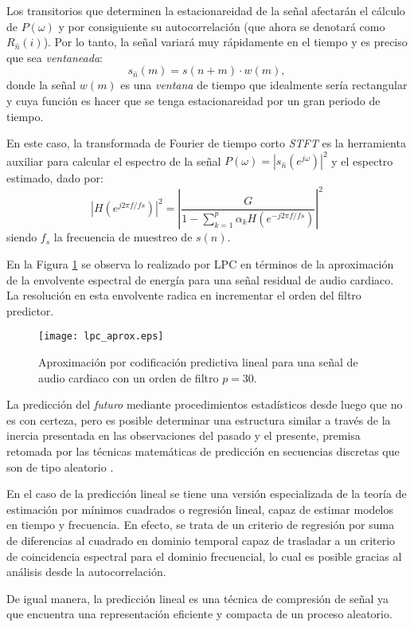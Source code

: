 Los transitorios que determinen la estacionareidad de la señal afectarán el cálculo de $P(\omega)$ y por consiguiente su autocorrelación (que ahora se denotará como $R_{\hat{n}}(i)$). Por lo tanto, la señal variará muy rápidamente en el tiempo y es preciso que sea \emph{ventaneada}: 
$$s_{\hat{n}}(m)=s(n+m) \cdot w(m),$$
donde la señal $w(m)$ es una \emph{ventana} de tiempo que idealmente sería rectangular y cuya función es hacer que se tenga estacionareidad por un gran periodo de tiempo.

En este caso, la transformada de Fourier de tiempo corto \emph{STFT} es la herramienta auxiliar para calcular el espectro de la señal $P(\omega)=|s_{\hat{n}}(e^{j\omega})|^2$ y el espectro estimado, dado por:
$$\left|H(e^{j2\pi f/fs})\right|^2=\left|\frac{G}{1-\displaystyle \sum_{k=1}^p \alpha_k H(e^{-j 2\pi f/fs})}\right|^2$$
siendo $f_s$ la frecuencia de muestreo de $s(n)$.

En la Figura \ref{lpc_aprox} se observa lo realizado por LPC en términos de la aproximación de la envolvente espectral de energía para una señal residual de audio cardiaco. La resolución en esta envolvente radica en incrementar el orden del filtro predictor.
\begin{figure}[ht]
  \centering
  \texttt{[image: lpc\_aprox.eps]}
  \caption{Aproximación por codificación predictiva lineal para una señal de audio cardiaco con un orden de filtro $p=30$.}
  \label{lpc_aprox}
\end{figure}

La predicción del \emph{futuro} mediante procedimientos estadísticos desde luego que no es con certeza, pero es posible determinar una estructura similar a través de la inercia presentada en las observaciones del pasado y el presente, premisa retomada por las técnicas matemáticas de predicción en secuencias discretas que son de tipo aleatorio \cite[]{Gersho1992}.

En el caso de la predicción lineal se tiene una versión especializada de la teoría de estimación por mínimos cuadrados o regresión lineal, capaz de estimar modelos en tiempo y frecuencia. En efecto, se trata de un criterio de regresión por suma de diferencias al cuadrado en dominio temporal capaz de trasladar a un criterio de coincidencia espectral para el dominio frecuencial, lo cual es posible gracias al análisis desde la autocorrelación.

De igual manera, la predicción lineal es una técnica de compresión de señal ya que encuentra una representación eficiente y compacta de un proceso aleatorio.

